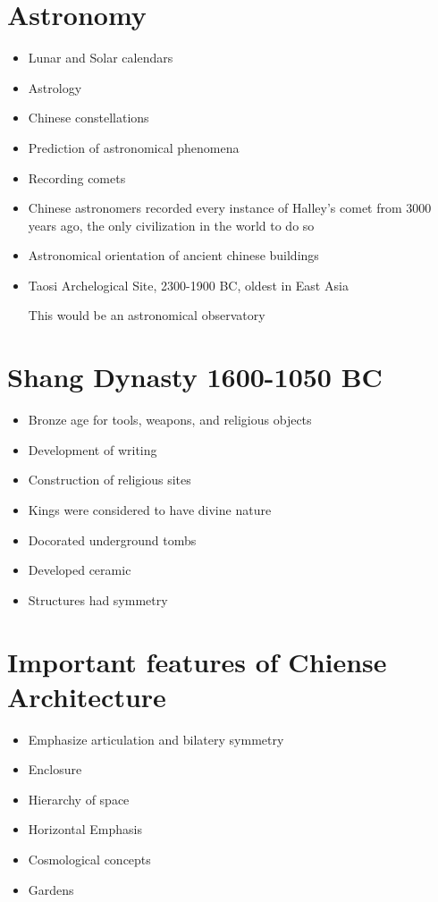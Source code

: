\documentclass{article}
\begin{document}
\section*{Astronomy}
\begin{itemize}
  \item Lunar and Solar calendars
  \item Astrology
  \item Chinese constellations
  \item Prediction of astronomical phenomena
  \item Recording comets
  \item Chinese astronomers recorded every instance of Halley's comet from 3000 years ago,
    the only civilization in the world to do so
  \item Astronomical orientation of ancient chinese buildings
  \item Taosi Archelogical Site, 2300-1900 BC, oldest in East Asia

    This would be an astronomical observatory
\end{itemize}

\section*{Shang Dynasty 1600-1050 BC}
\begin{itemize}
  \item Bronze age for tools, weapons, and religious objects
  \item Development of writing
  \item Construction of religious sites
  \item Kings were considered to have divine nature
  \item Docorated underground tombs
  \item Developed ceramic
  \item Structures had symmetry
\end{itemize}

\section*{Important features of Chiense Architecture}
\begin{itemize}
  \item Emphasize articulation and bilatery symmetry
  \item Enclosure
  \item Hierarchy of space
  \item Horizontal Emphasis
  \item Cosmological concepts
  \item Gardens
\end{itemize}
\end{document}
